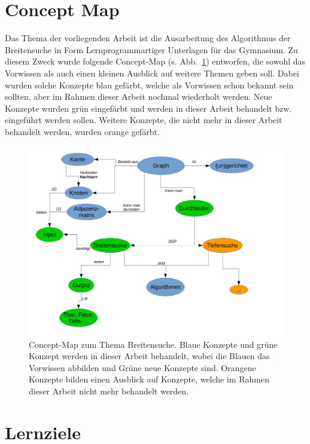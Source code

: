 \section{Concept Map}

Das Thema der vorliegenden Arbeit ist die Ausarbeitung des Algorithmus der Breitensuche in Form Lernprogrammartiger Unterlagen für das Gymnasium.  
Zu diesem Zweck wurde folgende Concept-Map (s. Abb.~\ref{fig:cmap}) entworfen, die sowohl das Vorwissen als auch einen kleinen Ausblick auf weitere Themen geben soll.
Dabei wurden solche Konzepte blau gefärbt, welche als Vorwissen schon bekannt sein sollten, aber im Rahmen dieser Arbeit nochmal wiederholt werden. 
Neue Konzepte wurden grün eingefärbt und werden in dieser Arbeit behandelt bzw. eingeführt werden sollen.
Weitere Konzepte, die nicht mehr in dieser Arbeit behandelt werden, wurden orange gefärbt. 

\begin{figure}[htb]
\begin{center}
\includegraphics[width=.99\textwidth]{../cmap/bsuche_cmap.pdf}
\caption{Concept-Map zum Thema Breitensuche.
Blaue Konzepte und grüne Konzept werden in dieser Arbeit behandelt, wobei die Blauen das Vorwissen abbilden und Grüne neue Konzepte sind. 
Orangene Konzepte bilden einen Ausblick auf Konzepte, welche im Rahmen dieser Arbeit nicht mehr behandelt werden. 
}
\label{fig:cmap}
\end{center}
\end{figure}


\section{Lernziele}

